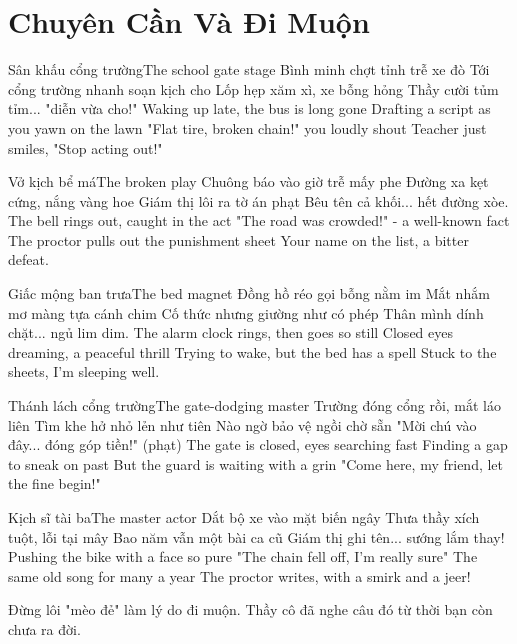 \chapter{Chuyên Cần Và Đi Muộn}

\begin{tutuyetbox}{Sân khấu cổng trường}{The school gate stage}
Bình minh chợt tỉnh trễ xe đò
Tới cổng trường nhanh soạn kịch cho
Lốp hẹp xăm xì, xe bỗng hỏng
Thầy cười tủm tỉm... "diễn vừa cho!"
\tcblower
Waking up late, the bus is long gone 
Drafting a script as you yawn on the lawn 
"Flat tire, broken chain!" you loudly shout 
Teacher just smiles, "Stop acting out!"
\end{tutuyetbox}

\begin{tutuyetbox}{Vở kịch bể má}{The broken play}
Chuông báo vào giờ trễ mấy phe
Đường xa kẹt cứng, nắng vàng hoe
Giám thị lôi ra tờ án phạt
Bêu tên cả khối... hết đường xòe.
\tcblower
The bell rings out, caught in the act 
"The road was crowded!" - a well-known fact 
The proctor pulls out the punishment sheet 
Your name on the list, a bitter defeat.
\end{tutuyetbox}

\begin{tutuyetbox}{Giấc mộng ban trưa}{The bed magnet}
Đồng hồ réo gọi bỗng nằm im
Mắt nhắm mơ màng tựa cánh chim
Cố thức nhưng giường như có phép
Thân mình dính chặt... ngủ lim dim.
\tcblower
The alarm clock rings, then goes so still 
Closed eyes dreaming, a peaceful thrill 
Trying to wake, but the bed has a spell 
Stuck to the sheets, I’m sleeping well.
\end{tutuyetbox}

\begin{tutuyetbox}{Thánh lách cổng trường}{The gate-dodging master}
Trường đóng cổng rồi, mắt láo liên
Tìm khe hở nhỏ lẻn như tiên
Nào ngờ bảo vệ ngồi chờ sẵn
"Mời chú vào đây... đóng góp tiền!" (phạt)
\tcblower
The gate is closed, eyes searching fast 
Finding a gap to sneak on past 
But the guard is waiting with a grin 
"Come here, my friend, let the fine begin!"
\end{tutuyetbox}

\begin{tutuyetbox}{Kịch sĩ tài ba}{The master actor}
Dắt bộ xe vào mặt biến ngây
Thưa thầy xích tuột, lỗi tại mây
Bao năm vẫn một bài ca cũ
Giám thị ghi tên... sướng lắm thay!
\tcblower
Pushing the bike with a face so pure 
"The chain fell off, I'm really sure" 
The same old song for many a year 
The proctor writes, with a smirk and a jeer!
\end{tutuyetbox}

\begin{ghichu}
Đừng lôi "mèo đẻ" làm lý do đi muộn. Thầy cô đã nghe câu đó từ thời bạn còn chưa ra đời.
\end{ghichu}